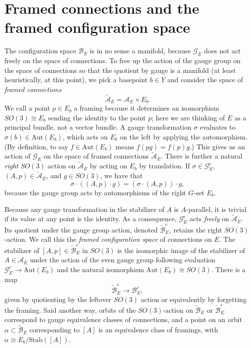\documentclass[10pt,a4paper]{amsart}
\theoremstyle{definition}
\theoremstyle{remark}
\numberwithin{figure}{qchap}
\begin{document}
\section{Framed connections and the framed configuration space}\label{sec:config-framed}
The configuration space $\mathcal B_E$ is in no sense a manifold, because $\mathcal G_E$ does not act freely on the space of connections. To free up the action of the gauge group on the space of connections so that the quotient by gauge is a manifold (at least heuristically, at this point), we pick a basepoint $b \in Y$ and consider the space of \emph{framed connections} 
$$\widetilde{\mathcal A}_E = \mathcal A_E \times E_b.$$ 
We call a point $p \in E_b$ a framing because it determines an isomorphism $SO(3) \cong E_b$ sending the identity to the point $p$; here we are thinking of $E$ as a principal bundle, not a vector bundle. A gauge transformation $\sigma$ evaluates to $\sigma(b) \in \text{Aut}(E_b)$, which acts on $E_b$ on the left by applying the automorphism. (By definition, to say $f\in\text{Aut}(E_b)$ means $f(pg) = f(p)g$.) This gives us an action of $\mathcal G_E$ on the space of framed connections $\widetilde{\mathcal A}_E$. There is further a natural \emph{right} $SO(3)$ action on $\widetilde{\mathcal A}_E$ by acting on $E_b$ by translation. If $\sigma \in \mathcal G^e_E$, $(A,p) \in \widetilde{\mathcal A}_E$, and $g \in SO(3)$, we have that 
$$\sigma \cdot ((A,p) \cdot g) = (\sigma \cdot (A,p)) \cdot g,$$ 
because the gauge group acts by automorphisms of the right $G$-set $E_b$.

Because any gauge transformation in the stabilizer of $A$ is $A$-parallel, it is trivial if its value at any point is the identity. As a consequence, $\mathcal G^e_E$ acts \textit{freely} on $\widetilde{\mathcal A}_E$. Its quotient under the gauge group action, denoted $\widetilde{\mathcal B}^e_E$, retains the right $SO(3)$-action. We call this the \textit{framed configuration space} of connections on $E$. The stabilizer of $[A,p] \in \widetilde{\mathcal B}^e_E$ in $SO(3)$ is the isomorphic image of the stabilizer of $A \in \mathcal A_E$ under the action of the even gauge group following evaluation $\mathcal G^e_E \to \text{Aut}(E_b)$ and the natural isomorphism $\text{Aut}(E_b) \cong SO(3)$. There is a map $$\widetilde{\mathcal B}^e_E \to \mathcal B^e_E,$$ given by quotienting by the leftover $SO(3)$ action or equivalently by forgetting the framing. Said another way, orbits of the $SO(3)$-action on $\widetilde{\mathcal B}_E$ or $\widetilde{\mathcal B}^e_E$ correspond to gauge equivalence classes of connections, and a point on an orbit $\alpha \subset \widetilde{\mathcal B}_E$ corresponding to $[A]$ is an equivalence class of framings, with $\alpha \cong E_b/\text{Stab}([A])$.
\end{document}
